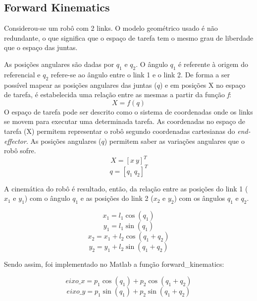 \documentclass[a4paper,twocolumn,final,11pt]{article}
\begin{document}
\subsection{ Forward Kinematics}
Considerou-se um robô com 2 links. O modelo geométrico usado é não redundante, o que significa que o espaço de tarefa tem o mesmo grau de liberdade que o espaço das juntas.

As posições angulares são dadas por $q_{1}$ e $q_{2}$. O ângulo $q_{1}$ é referente à origem do referencial e $q_{2}$ refere-se ao ângulo entre o link 1 e o link 2.
De forma a ser possível mapear as posições angulares das juntas ($q$) e em posições X no espaço de tarefa, é estabelecida uma relação entre as mesmas a partir da função \textit{f}: 
\begin{equation}
    X=f(q)
\end{equation}
O espaço de tarefa pode ser descrito como o sistema de coordenadas onde os links se movem para executar uma determinada tarefa.
As coordenadas no espaço de tarefa (X) permitem representar o robô segundo coordenadas cartesianas do \textit{end-effector}. As posições angulares ($q$) permitem saber as variações angulares que o robô sofre.
\begin{equation}
    X=\left[x~y\right]^T
\end{equation}
\begin{equation}
    q=\left[q_{1}~q_{2}\right]^T
\end{equation}

A cinemática do robô é resultado, então, da relação entre as posições do link 1 ($x_1$ e $y_1$) com o ângulo $q_{1}$ e as posições do link 2 ($x_2$ e $y_2$) com os ângulos $q_{1}$ e $q_{2}$.

\begin{equation}
    x_1 = l_1\cos(q_{1})
\end{equation}
\begin{equation}
    y_1 = l_1\sin(q_{1})
\end{equation}
\begin{equation}
    x_2 = x_1 +  l_2\cos(q_{1}+q_{2})
\end{equation}
\begin{equation}
    y_2 = y_1 +  l_2\sin(q_{1}+q_{2})
\end{equation}

Sendo assim, foi implementado no Matlab a função forward\_kinematics:

\begin{equation}
    eixo\_x = p_1\cos(q_{1}) + p_2\cos(q_{1}+q_{2})
\end{equation}
\begin{equation}
    eixo\_y = p_1\sin(q_{1}) + p_2\sin(q_{1}+q_{2})
\end{equation}
\end{document}
